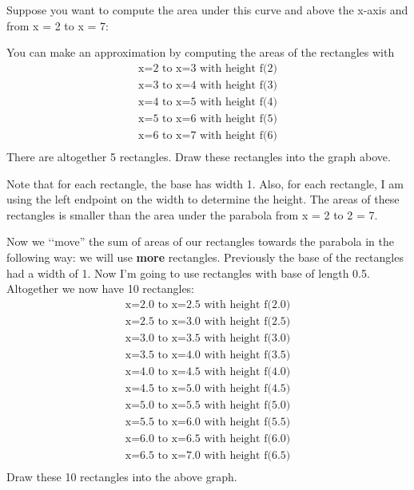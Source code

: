 Suppose you want to compute the area under this curve and above the
x-axis and from x = 2 to x = 7:


You can make an approximation by computing the areas of the rectangles
with
\begin{align*}
\text{x=2 to x=3 with height f(2)}\\
\text{x=3 to x=4 with height f(3)}\\
\text{x=4 to x=5 with height f(4)}\\
\text{x=5 to x=6 with height f(5)}\\
\text{x=6 to x=7 with height f(6)}\\
\end{align*}
There are altogether 5 rectangles. Draw these rectangles into the graph
above.


Note that for each rectangle, the base has width 1. Also, for each
rectangle, I am using the left endpoint on the width to determine the
height. The areas of these rectangles is smaller than the area under the
parabola from x = 2 to 2 = 7.

Now we \lq\lq move'' the sum of areas of our rectangles towards the parabola
in the following way: we will use \textbf{more} rectangles. Previously the
base of the rectangles had a width of 1. Now I'm going
to use rectangles with base of length 0.5. Altogether we now have 10
rectangles:
\begin{align*}
\text{x=2.0 to x=2.5 with height f(2.0)}\\
\text{x=2.5 to x=3.0 with height f(2.5)}\\
\text{x=3.0 to x=3.5 with height f(3.0)}\\
\text{x=3.5 to x=4.0 with height f(3.5)}\\
\text{x=4.0 to x=4.5 with height f(4.0)}\\
\text{x=4.5 to x=5.0 with height f(4.5)}\\
\text{x=5.0 to x=5.5 with height f(5.0)}\\
\text{x=5.5 to x=6.0 with height f(5.5)}\\
\text{x=6.0 to x=6.5 with height f(6.0)}\\
\text{x=6.5 to x=7.0 with height f(6.5)}\\
\end{align*}
Draw these 10 rectangles into the above graph.

